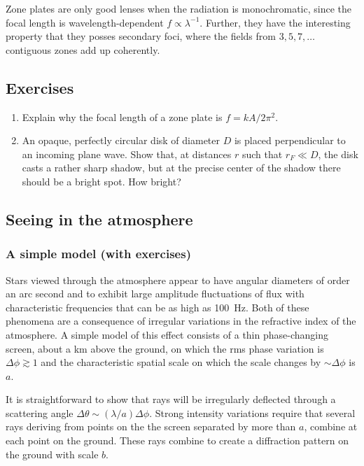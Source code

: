 Zone plates are only good lenses when the radiation is monochromatic, since
the focal length is wavelength-dependent $f\propto \lambda^{-1}$. Further, they
have 
the interesting property that they posses secondary foci, where the fields from
$3,5,7,\ldots$ contiguous zones add up coherently.

\subsection*{Exercises}
\begin{enumerate}
\setcounter{enumi}{\value{count}}
\item Explain why the focal length of a zone plate is $f={kA/2\pi^2}$. 
\item An opaque, perfectly circular disk of diameter $D$ is placed perpendicular
to an incoming plane wave. Show that, at distances $r$ such that $r_F\ll D$, the
disk casts a rather sharp shadow, but at the precise center of the shadow there
should be a bright spot. How bright?
\setcounter{count}{\value{enumi}}
\end{enumerate}

\subsection{Seeing in the atmosphere}

\subsubsection{A simple model (with exercises)}

Stars viewed through the atmosphere appear to have angular diameters of 
order an arc second and to exhibit large amplitude fluctuations of flux with
characteristic frequencies that can be as high as 100~Hz. Both of these 
phenomena are a consequence of irregular variations in the refractive
index of the atmosphere. A simple model of this effect consists of a thin
phase-changing screen, about a km above the ground, on which the rms phase
variation is $\Delta\phi\gtrsim 1$ and the characteristic spatial scale on 
which the scale changes by $\sim\Delta\phi$ is $a$.

It is straightforward to show that rays will be irregularly deflected through
a scattering angle $\Delta\theta\sim({\lambda/a})\Delta\phi$. Strong 
intensity variations require that several rays deriving from points on the 
the screen separated by more than $a$, combine at each point on the ground.
These rays combine to create a diffraction pattern on the ground with
scale $b$. 

